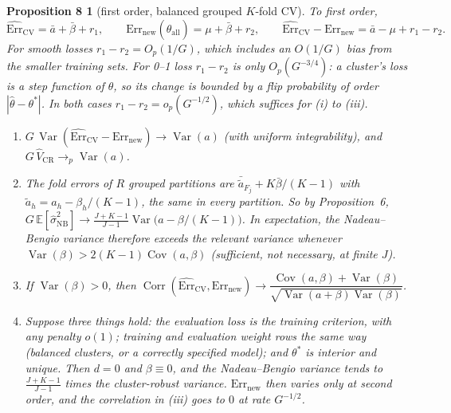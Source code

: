 \documentclass[11pt]{amsart}
\theoremstyle{plain}
\newtheorem*{prop8}{Proposition 8}
\theoremstyle{definition}
\theoremstyle{remark}
\newcommand{\Var}{\operatorname{Var}}
\newcommand{\Cov}{\operatorname{Cov}}
\newcommand{\Corr}{\operatorname{Corr}}
\newcommand{\E}{\mathbb{E}}
\newcommand{\CV}{\widehat{\mathrm{Err}}_{\mathrm{CV}}}
\newcommand{\Errnew}{\mathrm{Err}_{\mathrm{new}}}
\newcommand{\VCR}{\hat V_{\mathrm{CR}}}
\newcommand{\VNB}{\hat\sigma^2_{\mathrm{NB}}}
\newcommand{\fac}{\tfrac{J+K-1}{J-1}}
\begin{document}
\begin{prop8}[first order, balanced grouped $K$-fold CV]
To first order,
\[
\CV=\bar a+\bar\beta+r_1,\qquad \Errnew(\hat\theta_{\mathrm{all}})=\mu+\bar\beta+r_2,\qquad \CV-\Errnew=\bar a-\mu+r_1-r_2 .
\]
For smooth losses $r_1-r_2=O_p(1/G)$, which includes an $O(1/G)$ bias from the smaller training sets. For 0--1 loss $r_1-r_2$ is only $O_p(G^{-3/4})$: a cluster's loss is a step function of $\theta$, so its change is bounded by a flip probability of order $|\hat\theta-\theta^*|$. In both cases $r_1-r_2=o_p(G^{-1/2})$, which suffices for (i) to (iii).
\begin{enumerate}[label=(\roman*)]
\item $G\,\Var(\CV-\Errnew)\to\Var(a)$ (with uniform integrability), and $G\,\VCR\to_p\Var(a)$.
\item The fold errors of $R$ grouped partitions are $\bar{\tilde a}_{F_j}+K\bar\beta/(K-1)$ with $\tilde a_h=a_h-\beta_h/(K-1)$, the same in every partition. So by Proposition~6, $G\,\E[\VNB]\to\fac\Var\bigl(a-\beta/(K-1)\bigr)$. In expectation, the Nadeau--Bengio variance therefore exceeds the relevant variance whenever $\Var(\beta)>2(K-1)\Cov(a,\beta)$ (sufficient, not necessary, at finite $J$).
\item If $\Var(\beta)>0$, then $\Corr(\CV,\Errnew)\to\dfrac{\Cov(a,\beta)+\Var(\beta)}{\sqrt{\Var(a+\beta)\Var(\beta)}}$.
\item Suppose three things hold: the evaluation loss is the training criterion, with any penalty $o(1)$; training and evaluation weight rows the same way (balanced clusters, or a correctly specified model); and $\theta^*$ is interior and unique. Then $d=0$ and $\beta\equiv0$, and the Nadeau--Bengio variance tends to $\fac$ times the cluster-robust variance. $\Errnew$ then varies only at second order, and the correlation in (iii) goes to $0$ at rate $G^{-1/2}$.
\end{enumerate}
\end{prop8}
\end{document}
